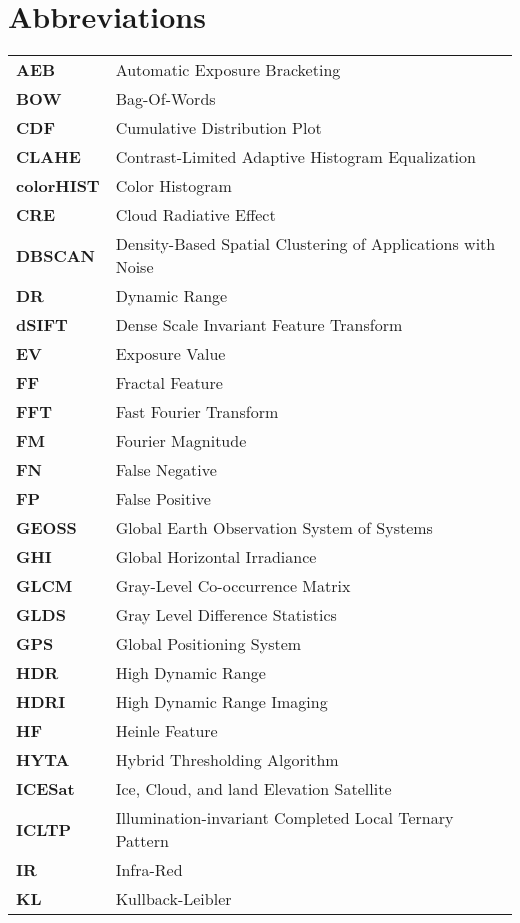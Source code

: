 \chapter*{\centering Abbreviations}
\begin{longtable}[l]{p{100pt}p{400pt}}
\textbf{AEB} & Automatic Exposure Bracketing  \\
\textbf{BOW} & Bag-Of-Words \\
\textbf{CDF} & Cumulative Distribution Plot \\
\textbf{CLAHE} & Contrast-Limited Adaptive Histogram Equalization \\
\textbf{colorHIST} & Color Histogram \\
\textbf{CRE} & Cloud Radiative Effect \\
\textbf{DBSCAN} & Density-Based Spatial Clustering of Applications with Noise \\
\textbf{DR} & Dynamic Range\\
\textbf{dSIFT} & Dense Scale Invariant Feature Transform \\
\textbf{EV} & Exposure Value \\
\textbf{FF} & Fractal Feature \\
\textbf{FFT} & Fast Fourier Transform \\
\textbf{FM} & Fourier Magnitude \\
\textbf{FN} & False Negative \\
\textbf{FP} & False Positive \\
\textbf{GEOSS} & Global
Earth Observation System of Systems \\
\textbf{GHI} & Global Horizontal Irradiance \\
\textbf{GLCM} & Gray-Level Co-occurrence Matrix \\
\textbf{GLDS} & Gray Level Difference Statistics \\
\textbf{GPS} & Global Positioning System \\
\textbf{HDR} & High Dynamic Range \\
\textbf{HDRI} & High Dynamic Range Imaging\\
\textbf{HF} & Heinle Feature \\
\textbf{HYTA} & Hybrid Thresholding Algorithm \\
\textbf{ICESat} & Ice, Cloud, and land Elevation Satellite \\
\textbf{ICLTP} & Illumination-invariant Completed Local Ternary Pattern \\
\textbf{IR} & Infra-Red \\
\textbf{KL} & Kullback-Leibler \\

\end{longtable}
